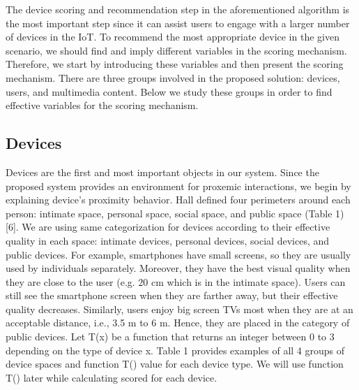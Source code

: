 \documentclass[]{IEEEphot}
\begin{document}
The device scoring and recommendation step in the aforementioned algorithm is the most important step since it can assist users to engage with a larger
number of devices in the IoT. To recommend the most appropriate device in the
given scenario, we should find and imply different variables in the scoring mechanism. Therefore, we start by introducing these variables and then present the
scoring mechanism. There are three groups involved in the proposed solution:
devices, users, and multimedia content. Below we study these groups in order to
find effective variables for the scoring mechanism.

\subsection{Devices}

Devices are the first and most important objects in our system. Since the proposed system provides an environment for proxemic interactions, we begin by
explaining device’s proximity behavior. Hall defined four perimeters around each
person: intimate space, personal space, social space, and public space (Table 1)
[6]. We are using same categorization for devices according to their effective quality in each space: intimate devices, personal devices, social devices, and public
devices. For example, smartphones have small screens, so they are usually used
by individuals separately. Moreover, they have the best visual quality when they
are close to the user (e.g. 20 cm which is in the intimate space). Users can still
see the smartphone screen when they are farther away, but their effective quality decreases. Similarly, users enjoy big screen TVs most when they are at an
acceptable distance, i.e., 3.5 m to 6 m. Hence, they are placed in the category
of public devices. Let T(x) be a function that returns an integer between 0 to 3
depending on the type of device x. Table 1 provides examples of all 4 groups of
device spaces and function T() value for each device type. We will use function
T() later while calculating scored for each device.
\end{document}
